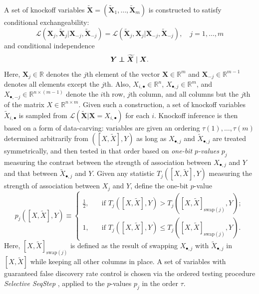 \documentclass[12pt]{article}
\theoremstyle{definition}
\theoremstyle{remark}
\def\independenT#1#2{\mathrel{\rlap{$#1#2$}\mkern2mu{#1#2}}}
\newcommand\independent{\protect\mathpalette{\protect\independenT}{\perp}}
\newcommand{\prx}{\bm X}
\newcommand{\srx}{X}
\newcommand{\prxk}{{{\widetilde{\bm X}}}}
\newcommand{\srxk}{\widetilde X}
\newcommand{\pry}{{\bm Y}}
\newcommand{\sry}{Y}
\begin{document}
A set of knockoff variables $\prxk = (\prxk_1, \dots, \prxk_m)$ is constructed to satisfy conditional exchangeability:
\begin{equation}
\mathcal L(\prx_j, \prxk_j | \prx_{-j}, \prxk_{-j}) = \mathcal L(\prxk_j, \prx_j | \prx_{-j}, \prxk_{-j}), \quad j = 1, \dots, m
\label{conditional-exchangeability}
\end{equation}
and conditional independence 
\begin{equation}
\pry \independent \prxk \mid \prx.
\label{knockoff-conditional-independence}
\end{equation}
Here, $\prx_j \in \mathbb R$ denotes the $j$th element of the vector $\prx \in \mathbb R^m$ and $\prx_{-j} \in \mathbb R^{m-1}$ denotes all elements except the $j$th. Also, $\srx_{i,\bullet} \in \mathbb R^{n}$, $\srx_{\bullet, j} \in \mathbb R^m$, and $\srx_{\bullet, -j} \in \mathbb R^{n \times (m-1)}$ denote the $i$th row, $j$th column, and all columns but the $j$th of the matrix $\srx \in \mathbb R^{n \times m}$. Given such a construction, a set of knockoff variables $\srxk_{i,\bullet}$ is sampled from  $\mathcal L(\prxk|\prx = \srx_{i,\bullet})$ for each $i$. Knockoff inference is then based on a form of data-carving: variables are given an ordering $\tau(1), \dots, \tau(m)$ determined arbitrarily from $([\srx, \srxk], \sry)$ as long as $\srx_{\bullet, j}$ and $\srxk_{\bullet, j}$ are treated symmetrically, and then tested in that order based on \textit{one-bit $p$-values} $p_j$ measuring the contrast between the strength of association between $\srx_{\bullet, j}$ and $\sry$ and that between $\srxk_{\bullet, j}$ and $\sry$. Given any statistic $T_j([\srx, \srxk], \sry)$ measuring the strength of association between $\srx_j$ and $\sry$, define the one-bit $p$-value
\begin{equation}
p_j([\srx, \srxk], \sry) \equiv 
\begin{cases}
\frac12, \quad &\text{if } T_j([\srx, \srxk], \sry) > T_j([\srx, \srxk]_{\text{swap}(j)}, \sry);  \\
1, \quad &\text{if } T_j([\srx, \srxk], \sry) \leq T_j([\srx, \srxk]_{\text{swap}(j)}, \sry).
\end{cases}
\label{one-bit-pvalue}
\end{equation}
Here, $[\srx, \srxk]_{\text{swap}(j)}$ is defined as the result of swapping $\srx_{\bullet, j}$ with $\srxk_{\bullet, j}$ in $[\srx, \srxk]$ while keeping all other columns in place. A set of variables with guaranteed false discovery rate control is chosen via the ordered testing procedure \textit{Selective SeqStep} \cite{BC15}, applied to the $p$-values $p_j$ in the order $\tau$.
\end{document}
